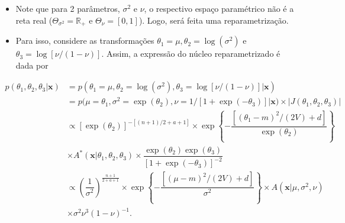 \documentclass[9pt]{beamer}
\begin{document}
\begin{frame}
\begin{itemize}
\justifying	
\item Note que para 2 parâmetros, $\sigma^2$ e $\nu$, o respectivo espaço paramétrico não é a reta real ($\Theta_{\sigma^2} = \mathbb{R}_+$ e $\Theta_{\nu} = [0,1]$). Logo, será feita uma reparametrização.
\item Para isso, considere as transformações $\theta_1 = \mu, \theta_2 = \log(\sigma^2)$ e $\theta_3 = \log[\nu/(1-\nu)]$. Assim, a expressão do núcleo reparametrizado é dada por
\end{itemize}
\small
\begin{align}
p(\theta_1, \theta_2, \theta_3 | \bm{x})
&= p(\theta_1 = \mu, \theta_2 = \log(\sigma^2), \theta_3 = \log[\nu/(1-\nu)] | \bm{x}) \nonumber \\
&= p(\mu = \theta_1, \sigma^2 = \exp(\theta_2), \nu = 1/[1 + \exp(-\theta_3)] | \bm{x}) \times |J(\theta_1, \theta_2, \theta_3)| \nonumber \\
&\propto \left[\exp(\theta_2)\right]^{-[(n + 1)/2 + a + 1]} \times \exp\left\{-\dfrac{\left[(\theta_1 - m)^2 / (2V) + d\right]}{\exp(\theta_2)}\right\} \nonumber \\
&\times A^*(\bm{x} | \theta_1, \theta_2, \theta_3) \times  \dfrac{\exp(\theta_2) \exp(\theta_3)}{\left[1 + \exp(-\theta_3)\right]^{-2}} \nonumber \\	&\propto \left(\dfrac{1}{\sigma^2}\right)^{\frac{n + 1}{2 + a + 1}} \times \exp\left\{-\dfrac{\left[(\mu - m)^2 / (2V) + d\right]}{\sigma^2}\right\} \times A(\bm{x} | \mu, \sigma^2, \nu) \nonumber \\
&\times \sigma^2 \nu^3(1-\nu)^{-1}. \label{eq:sir_dpre}
\end{align}
\end{frame}
\end{document}
